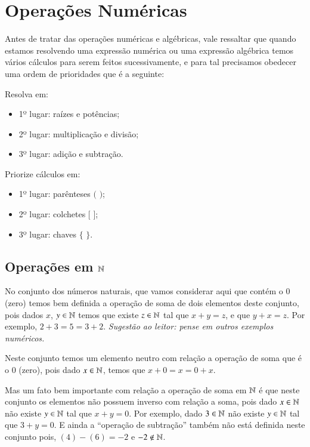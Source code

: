  \chapter{Operações Numéricas}

 Antes de tratar das operações numéricas e algébricas, vale ressaltar que quando estamos resolvendo uma expressão numérica ou uma expressão algébrica temos vários cálculos para serem feitos sucessivamente, e para tal precisamos obedecer uma ordem de prioridades que é a seguinte:

\begin{multicols}{2}
Resolva em:
\begin{itemize}
\item 1º lugar: raízes e potências;
\item 2º lugar: multiplicação e divisão;
\item 3º lugar: adição e subtração.
\end{itemize}

Priorize cálculos em:
\begin{itemize}
\item 1º lugar: parênteses $($ $)$;
\item 2º lugar: colchetes $[$ $]$;
\item 3º lugar: chaves $\{$ $\}$.
\end{itemize}
\end{multicols}

 \section{Operações em \texorpdfstring{$\mathbb{N}$}{N}}
 No conjunto dos números naturais, que vamos considerar aqui que contém o $0$ (zero) temos bem definida a operação de soma de dois elementos deste conjunto, pois dados $x$, $y \in \mathbb{N}$ temos que existe $z \in \mathbb{N}$ tal que $x+y=z$, e que $y+x=z$. Por exemplo, $2+3=5=3+2$. \emph{Sugestão ao leitor: pense em outros exemplos numéricos.}
 
 Neste conjunto temos um elemento neutro com relação a operação de soma que é o $0$ (zero), pois dado $x \in \mathbb{N}$, temos que $x+0=x=0+x$.
 
 Mas um fato bem importante com relação a operação de soma em $\mathbb{N}$ é que neste conjunto os elementos não possuem inverso com relação a soma, pois dado $x \in \mathbb{N}$ não existe $y \in \mathbb{N}$ tal que $x+y=0$. Por exemplo, dado $3 \in \mathbb{N}$ não existe $y \in \mathbb{N}$ tal que $3 + y=0$. E ainda a ``operação de subtração'' também não está definida neste conjunto pois, $(4)-(6)=-2$ e $-2 \notin \mathbb{N}$.
 
